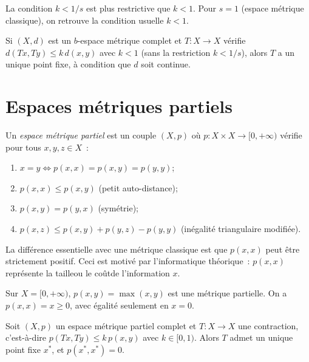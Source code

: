 \begin{remarque}
La condition $k < 1/s$ est plus restrictive que $k < 1$. Pour $s = 1$ (espace
m\'etrique classique), on retrouve la condition usuelle $k < 1$.
\end{remarque}

\begin{theoreme}
Si $(X, d)$ est un $b$-espace m\'etrique complet et $T : X \to X$ v\'erifie
$d(Tx, Ty) \leq k \, d(x, y)$ avec $k < 1$ (sans la restriction $k < 1/s$),
alors $T$ a un unique point fixe, \`a condition que $d$ soit continue.
\end{theoreme}

\section{Espaces m\'etriques partiels}

\begin{definition}
Un \emph{espace m\'etrique partiel} est un couple $(X, p)$ o\`u
$p : X \times X \to [0, +\infty)$ v\'erifie pour tous $x, y, z \in X$~:
\begin{enumerate}
    \item $x = y \Leftrightarrow p(x, x) = p(x, y) = p(y, y)$;
    \item $p(x, x) \leq p(x, y)$ \quad (petit auto-distance);
    \item $p(x, y) = p(y, x)$ \quad (sym\'etrie);
    \item $p(x, z) \leq p(x, y) + p(y, z) - p(y, y)$ \quad (in\'egalit\'e triangulaire modifi\'ee).
\end{enumerate}
\end{definition}

\begin{remarque}
La diff\'erence essentielle avec une m\'etrique classique est que $p(x, x)$
peut \^etre strictement positif. Ceci est motiv\'e par l'informatique
th\'eorique~: $p(x, x)$ repr\'esente la \og{}taille\fg ou le
\og{}co\^ut\fg de l'information $x$.
\end{remarque}

\begin{exemple}
Sur $X = [0, +\infty)$, $p(x, y) = \max(x, y)$ est une m\'etrique partielle.
On a $p(x, x) = x \geq 0$, avec \'egalit\'e seulement en $x = 0$.
\end{exemple}

\begin{theoreme}[Matthews, 1994]
Soit $(X, p)$ un espace m\'etrique partiel complet et $T : X \to X$ une
contraction, c'est-\`a-dire $p(Tx, Ty) \leq k \, p(x, y)$ avec $k \in [0, 1)$.
Alors $T$ admet un unique point fixe $x^*$, et $p(x^*, x^*) = 0$.
\end{theoreme}

